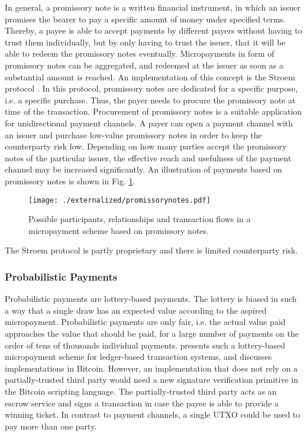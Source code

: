 In general, a promissory note is a written financial instrument, in which an issuer promises the bearer to pay a specific amount of money under specified terms. Thereby, a payee is able to accept payments by different payers without having to trust them individually, but by only having to trust the issuer, that it will be able to redeem the promissory notes eventually. Micropayments in form of promissory notes can be aggregated, and redeemed at the issuer as soon as a substantial amount is reached. An implementation of this concept is the Stroem protocol \parencite{strawpay}. In this protocol, promissory notes are dedicated for a specific purpose, i.e. a specific purchase. Thus, the payer needs to procure the promissory note at time of the transaction. Procurement of promissory notes is a suitable application for unidirectional payment channels. A payer can open a payment channel with an issuer and purchase low-value promissory notes in order to keep the counterparty risk low. Depending on how many parties accept the promissory notes of the particular issuer, the effective reach and usefulness of the payment channel may be increased significantly. An illustration of payments based on promissory notes is shown in Fig. \ref{fig:promissorynotes}.

\begin{figure}
\centering
\texttt{[image: ./externalized/promissorynotes.pdf]}
\caption{Possible participants, relationships and transaction flows in a micropayment scheme based on promissory notes.}
\label{fig:promissorynotes}
\end{figure}

The Stroem protocol is partly proprietary and there is limited counterparty risk.

\subsubsection{Probabilistic Payments}

Probabilistic payments \parencite{wheeler1996transactions,rivest1996payword,rivest1997electronic} are lottery-based payments. The lottery is biased in such a way that a single draw has an expected value according to the aspired micropayment. Probabilistic payments are only fair, i.e. the actual value paid approaches the value that should be paid, for a large number of payments on the order of tens of thousands individual payments. 
\cite{Pass:2015:MDC:2810103.2813713} presents such a lottery-based micropayment scheme for ledger-based transaction systems, and discusses implementations in Bitcoin. However, an implementation that does not rely on a partially-trusted third party would need a new signature verification primitive in the Bitcoin scripting language. The partially-trusted third party acts as an escrow service and signs a transaction in case the payee is able to provide a winning ticket. In contrast to payment channels, a single \ac{UTXO} could be used to pay more than one party.

